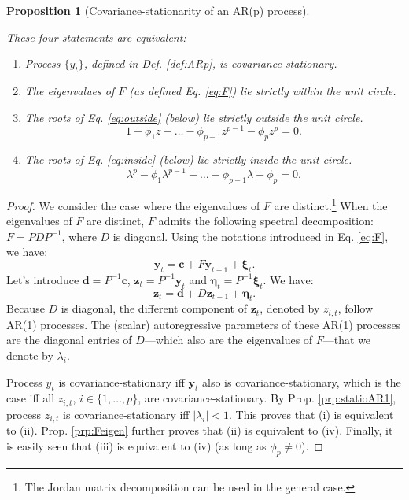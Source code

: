 \documentclass[
  12pt,
]{book}
\providecommand{\tightlist}{%
  \setlength{\itemsep}{0pt}\setlength{\parskip}{0pt}}
\newtheorem{proposition}{Proposition}[chapter]
\theoremstyle{definition}
\theoremstyle{definition}
\theoremstyle{definition}
\theoremstyle{definition}
\theoremstyle{remark}
\begin{document}
\begin{proposition}[Covariance-stationarity of an AR(p) process]
\protect\hypertarget{prp:stability}{}\label{prp:stability}

These four statements are equivalent:

\begin{enumerate}
\def\labelenumi{\roman{enumi}.}
\tightlist
\item
  Process \(\{y_t\}\), defined in Def. \ref{def:ARp}, is covariance-stationary.
\item
  The eigenvalues of \(F\) (as defined Eq. \eqref{eq:F}) lie strictly within the unit circle.
\item
  The roots of Eq. \eqref{eq:outside} (below) lie strictly outside the unit circle.
  \begin{equation}
  1 - \phi_1 z - \dots - \phi_{p-1}z^{p-1} - \phi_p z^p = 0.\label{eq:outside}
  \end{equation}
\item
  The roots of Eq. \eqref{eq:inside} (below) lie strictly inside the unit circle.
  \begin{equation}
  \lambda^p - \phi_1 \lambda^{p-1} - \dots - \phi_{p-1}\lambda - \phi_p = 0.\label{eq:inside}
  \end{equation}
\end{enumerate}

\end{proposition}

\begin{proof}
We consider the case where the eigenvalues of \(F\) are distinct.\footnote{The Jordan matrix decomposition can be used in the general case.} When the eigenvalues of \(F\) are distinct, \(F\) admits the following spectral decomposition: \(F = PDP^{-1}\), where \(D\) is diagonal. Using the notations introduced in Eq. \eqref{eq:F}, we have:
\[
\mathbf{y}_{t} = \mathbf{c} + F \mathbf{y}_{t-1} + \boldsymbol\xi_{t}.
\]
Let's introduce \(\mathbf{d} = P^{-1}\mathbf{c}\), \(\mathbf{z}_t = P^{-1}\mathbf{y}_t\) and \(\boldsymbol\eta_t = P^{-1}\boldsymbol\xi_t\). We have:
\[
\mathbf{z}_{t} = \mathbf{d} + D \mathbf{z}_{t-1} + \boldsymbol\eta_{t}.
\]
Because \(D\) is diagonal, the different component of \(\mathbf{z}_t\), denoted by \(z_{i,t}\), follow AR(1) processes. The (scalar) autoregressive parameters of these AR(1) processes are the diagonal entries of \(D\)---which also are the eigenvalues of \(F\)---that we denote by \(\lambda_i\).

Process \(y_t\) is covariance-stationary iff \(\mathbf{y}_{t}\) also is covariance-stationary, which is the case iff all \(z_{i,t}\), \(i \in \{1,\dots,p\}\), are covariance-stationary. By Prop. \ref{prp:statioAR1}, process \(z_{i,t}\) is covariance-stationary iff \(|\lambda_i|<1\). This proves that (i) is equivalent to (ii). Prop. \ref{prp:Feigen} further proves that (ii) is equivalent to (iv). Finally, it is easily seen that (iii) is equivalent to (iv) (as long as \(\phi_p \ne 0\)).
\end{proof}
\end{document}
